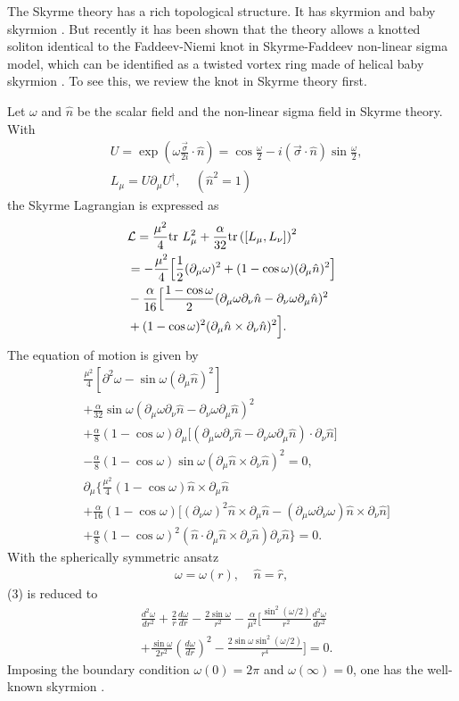 \documentclass[twocolumn,showpacs,showkeys]{revtex4}
\newcommand{\bea}{\begin{eqnarray}}
\newcommand{\eea}{\end{eqnarray}}
\newcommand{\dfrac}{\displaystyle\frac}
\newcommand{\nn}{\nonumber}
\newcommand{\hn}{\hat n}
\begin{document}
The Skyrme theory has a rich topological structure.
It has skyrmion and baby skyrmion \cite{skyrme,piet}.
But recently it has been shown that the theory allows
a knotted soliton identical to
the Faddeev-Niemi knot in Skyrme-Faddeev
non-linear sigma model, which can be identified as a twisted 
vortex ring made of helical baby skyrmion \cite{prl01,plb04}. 
To see this, we review the knot in Skyrme theory first. 

Let $\omega$ and $\hn$ be the scalar field and 
the non-linear sigma field in Skyrme theory. With
\bea
&U = \exp (\omega \dfrac{\vec \sigma}{2i} \cdot \hat n)
= \cos \dfrac{\omega}{2} - i (\vec \sigma \cdot \hat n) 
\sin \dfrac{\omega}{2}, \nn\\
&L_\mu = U\partial_\mu U^{\dagger}, ~~~~~({\hat n}^2 = 1)
\eea
the Skyrme Lagrangian is expressed as
\bea
&{\cal L} = \dfrac{\mu^2}{4} {\rm tr} ~L_\mu^2 + \dfrac{\alpha}{32}
{\rm tr} \left( \left[ L_\mu, L_\nu \right] \right)^2  \nn \\
&= - \dfrac{\mu^2}{4} \Big[ \dfrac{1}{2} (\partial_\mu \omega)^2
+(1-\cos\omega)(\partial_\mu \hat n)^2 \Big]  \nn \\
& -\dfrac{\alpha}{16} \Big[ \dfrac{1-\cos\omega}{2} (\partial_\mu
\omega \partial_\nu \hat n - \partial_\nu \omega \partial_\mu \hat n)^2  \nn\\
& + (1-\cos\omega)^2 (\partial_\mu \hat n \times \partial_\nu \hat
n)^2 \Big].
\label{slag}
\eea
The equation of motion is given by
\bea
&\dfrac{\mu^2}{4} \left[ \partial^2 \omega -\sin\omega 
(\partial_\mu \hat n)^2 \right] \nn\\
&+\dfrac{\alpha}{32} \sin\omega (\partial_\mu
\omega \partial_\nu \hat n  -\partial_\nu \omega \partial_\mu \hat n)^2 \nn\\
&+\dfrac{\alpha}{8} (1-\cos\omega)
\partial_\mu \big[ (\partial_\mu
\omega \partial_\nu \hat n  -\partial_\nu \omega \partial_\mu \hat
n) \cdot \partial_\nu \hat n \big] \nn\\
& - \dfrac{\alpha}{8} (1-\cos\omega) \sin\omega (\partial_\mu \hat n \times
\partial_\nu \hat n)^2 =0, \nn \\
&\partial_\mu \Big\{ \dfrac{\mu^2}{4} (1-\cos\omega) \hat n \times
\partial_\mu \hat n \nn\\
& + \dfrac{\alpha}{16} (1-\cos\omega)
\big[ (\partial_\nu \omega)^2
\hat n \times \partial_\mu \hat n
-(\partial_\mu \omega \partial_\nu \omega) \hat n \times
\partial_\nu \hat n \big] \nn\\
&+\dfrac{\alpha}{8} (1-\cos\omega)^2
(\hat n \cdot \partial_\mu \hat n \times
\partial_\nu \hat n) \partial_\nu \hat n \Big\}=0.
\label{seq}
\eea
With the spherically symmetric ansatz
\bea
\omega = \omega (r),~~~~~\hat n = \hat r,
\eea
(3) is reduced to
\bea
&\dfrac{d^2 \omega}{dr^2} +\dfrac{2}{r} \dfrac{d\omega}{dr} -\dfrac{2
\sin\omega}{r^2}
-\dfrac{\alpha}{\mu^2} \Big[ \dfrac{\sin^2 (\omega /2)}{r^2}
\dfrac{d^2 \omega}{dr^2} \nn\\
&+\dfrac{\sin\omega}{2 r^2} (\dfrac{d\omega}{dr})^2
-\dfrac{2 \sin\omega \sin^2 (\omega /2)}{r^4} \Big] =0.
\eea
Imposing the boundary condition $\omega(0)= 2\pi$ and $\omega(\infty)= 0$,
one has the well-known skyrmion \cite{skyrme}.
\end{document}
